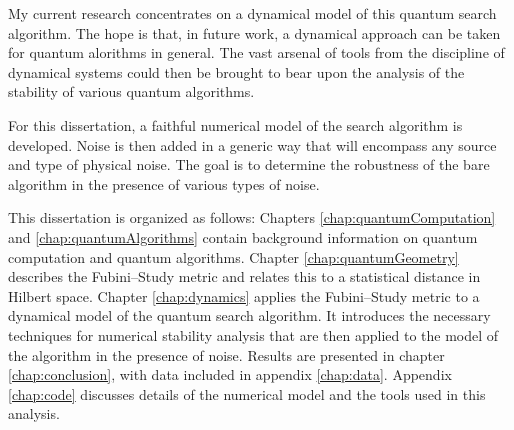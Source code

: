 My current research concentrates on a dynamical model of this
quantum search algorithm.  The hope is that, in future work,
a dynamical approach can be taken for quantum alorithms in 
general.  The vast arsenal of tools from the discipline of 
dynamical systems could then be brought to bear upon the 
analysis of the stability of various quantum algorithms.

For this dissertation, a faithful numerical model of the search
algorithm is developed.  Noise is then added
in a generic way that will encompass any source and type of 
physical noise.
The goal is to determine the robustness of the bare algorithm
in the presence of various types of noise.

This dissertation is organized as follows:  Chapters \ref{chap:quantumComputation}
and \ref{chap:quantumAlgorithms} contain background information on quantum computation
and quantum algorithms.
Chapter \ref{chap:quantumGeometry} describes the
Fubini--Study metric and relates this to a statistical distance in Hilbert space.
Chapter \ref{chap:dynamics} applies the Fubini--Study  metric to a dynamical 
model of the quantum search algorithm.
It introduces the
necessary techniques for numerical stability analysis that are then applied to
the model of the algorithm in the presence of noise. 
Results are presented in chapter \ref{chap:conclusion}, with
data included in appendix \ref{chap:data}.
Appendix \ref{chap:code} discusses details of the numerical model and the 
tools used in this analysis. 


